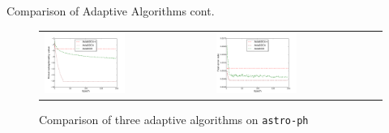 \begin{frame}{Comparison of Adaptive Algorithms cont.}
\begin{figure}[htbp]
\begin{tabular}{ll}
    \centering
        \includegraphics[width=0.5\textwidth]{images/comp_adas_obej_astro.pdf} &
        \includegraphics[width=0.5\textwidth]{images/comp_adas_terror_astro.pdf}
        \end{tabular}
    \caption{Comparison of three adaptive algorithms on \texttt{astro-ph}} 
    \label{fig:ada_all2}
\end{figure}
\end{frame}

